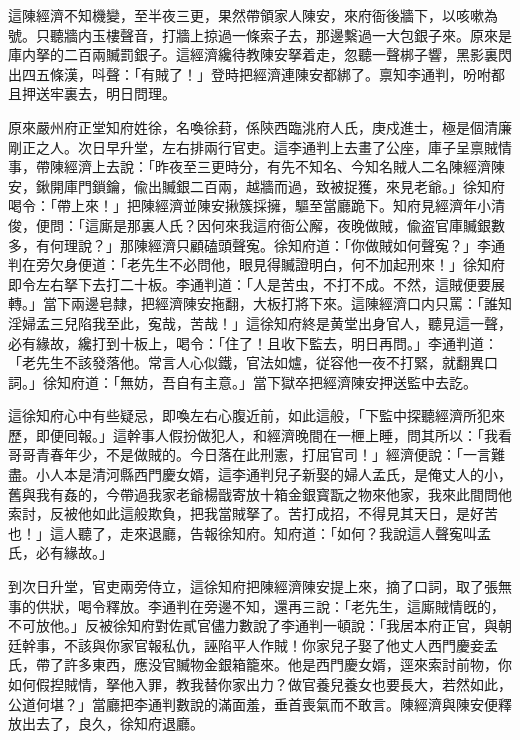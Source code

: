 這陳經濟不知機變，至半夜三更，果然帶領家人陳安，來府衙後牆下，以咳嗽為號。只聽牆内玉樓聲音，打牆上掠過一條索子去，那邊繫過一大包銀子來。原來是庫内拏的二百兩贓罰銀子。這經濟纔待教陳安拏着走，忽聽一聲梆子響，黑影裏閃出四五條漢，呌聲：「有賊了！」登時把經濟連陳安都綁了。禀知李通判，吩咐都且押送牢裏去，明日問理。

原來嚴州府正堂知府姓徐，名喚徐葑，係陝西臨洮府人氏，庚戍進士，極是個清廉剛正之人。次日早升堂，左右排兩行官吏。這李通判上去畫了公座，庫子呈禀賊情事，帶陳經濟上去說：「昨夜至三更時分，有先不知名、今知名賊人二名陳經濟陳安，鍬開庫門鎖鑰，偸出贓銀二百兩，越牆而過，致被捉獲，來見老爺。」徐知府喝令：「帶上來！」把陳經濟並陳安揪簇採擁，驅至當廳跪下。知府見經濟年小清俊，便問：「這廝是那裏人氏？因何來我這府衙公廨，夜晚做賊，偸盗官庫贓銀數多，有何理說？」那陳經濟只顧磕頭聲寃。徐知府道：「你做賊如何聲寃？」李通判在旁欠身便道：「老先生不必問他，眼見得贓證明白，何不加起刑來！」徐知府即令左右拏下去打二十板。李通判道：「人是苦虫，不打不成。不然，這賊便要展轉。」當下兩邊皂隸，把經濟陳安拖翻，大板打將下來。這陳經濟口内只罵：「誰知淫婦孟三兒陷我至此，寃哉，苦哉！」這徐知府終是黄堂出身官人，聽見這一聲，必有緣故，纔打到十板上，喝令：「住了！且收下監去，明日再問。」李通判道：「老先生不該發落他。常言人心似鐵，官法如爐，従容他一夜不打緊，就翻異口詞。」徐知府道：「無妨，吾自有主意。」當下獄卒把經濟陳安押送監中去訖。

這徐知府心中有些疑忌，即喚左右心腹近前，如此這般，「下監中探聽經濟所犯來歷，即便囘報。」這幹事人假扮做犯人，和經濟晚間在一㭱上睡，問其所以：「我看哥哥青春年少，不是做賊的。今日落在此刑憲，打屈官司！」經濟便說：「一言難盡。小人本是清河縣西門慶女婿，這李通判兒子新娶的婦人孟氏，是俺丈人的小，舊與我有姦的，今帶過我家老爺楊戩寄放十箱金銀寳翫之物來他家，我來此間問他索討，反被他如此這般欺負，把我當賊拏了。苦打成招，不得見其天日，是好苦也！」這人聽了，走來退廳，告報徐知府。知府道：「如何？我說這人聲寃叫孟氏，必有緣故。」

到次日升堂，官吏兩旁侍立，這徐知府把陳經濟陳安提上來，摘了口詞，取了張無事的供狀，喝令釋放。李通判在旁邊不知，還再三說：「老先生，這廝賊情旣的，不可放他。」反被徐知府對佐貳官儘力數說了李通判一頓說：「我居本府正官，與朝廷幹事，不該與你家官報私仇，誣陷平人作賊！你家兒子娶了他丈人西門慶妾孟氏，帶了許多東西，應没官贓物金銀箱籠來。他是西門慶女婿，逕來索討前物，你如何假揑賊情，拏他入罪，教我替你家出力？做官養兒養女也要長大，若然如此，公道何堪？」當廳把李通判數說的滿面羞，垂首喪氣而不敢言。陳經濟與陳安便釋放出去了，良久，徐知府退廳。

